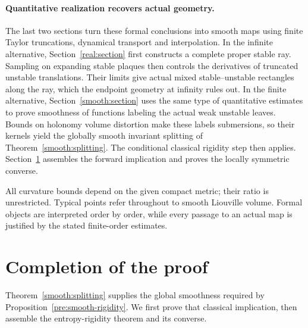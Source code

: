\documentclass[11pt,a4paper]{article}
\theoremstyle{definition}
\theoremstyle{remark}
\numberwithin{equation}{section}
\begin{document}
\paragraph{Quantitative realization recovers actual geometry.}
The last two sections turn these formal conclusions into smooth maps
using finite Taylor truncations, dynamical transport and interpolation.
In the infinite alternative, Section~\ref{real:section} first constructs
a complete proper stable ray. Sampling on expanding stable plaques
then controls the derivatives of truncated unstable translations.
Their limits give actual mixed stable--unstable rectangles along the
ray, which the endpoint geometry at infinity rules out. In the finite alternative,
Section~\ref{smooth:section} uses the same type of quantitative estimates
to prove smoothness of functions labeling the actual weak unstable
leaves. Bounds on holonomy volume distortion make these labels
submersions, so their kernels yield the globally smooth invariant
splitting of Theorem~\ref{smooth:splitting}. The conditional classical
rigidity step then applies. Section~\ref{sec:completion} assembles the
forward implication and proves the locally symmetric converse.

All curvature bounds depend on the given compact metric; their ratio
is unrestricted. Typical points refer throughout to smooth Liouville
volume. Formal objects are interpreted order by order, while every
passage to an actual map is justified by the stated finite-order
estimates.









\section{Completion of the proof}
\label{sec:completion}

Theorem~\ref{smooth:splitting} supplies the global smoothness required
by Proposition~\ref{pre:smooth-rigidity}. We first prove that classical
implication, then assemble the entropy-rigidity theorem and its converse.
\end{document}

